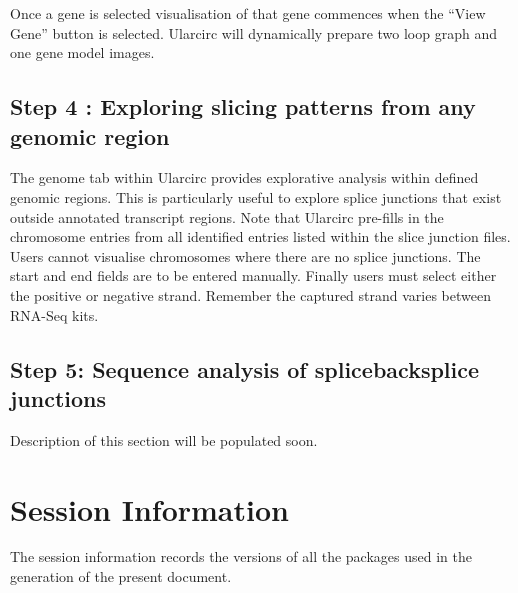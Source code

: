 \documentclass[12pt]{article}\usepackage[]{graphicx}\usepackage[]{color}
\begin{document}
Once a gene is selected visualisation of that gene commences when the ``View Gene'' button is selected. Ularcirc will dynamically prepare two loop graph and one gene model images.




\subsection{Step 4 : Exploring slicing patterns from any genomic region} \label{sec:Step4}
The genome tab within Ularcirc provides explorative analysis within defined genomic regions. This is particularly useful to explore splice junctions that exist outside annotated transcript regions. Note that Ularcirc pre-fills in the chromosome entries from all identified entries listed within the slice junction files. Users cannot visualise chromosomes where there are no splice junctions. The start and end fields are to be entered manually. Finally users must select either the positive or negative strand. Remember the captured strand varies between RNA-Seq kits.

\subsection{Step 5: Sequence analysis of splice\/backsplice junctions} \label{sec:Step5}

Description of this section will be populated soon.

\section{Session Information} \label{sec:sessioninfo}

The session information records the versions of all the packages used in the generation of the present document.
\end{document}

